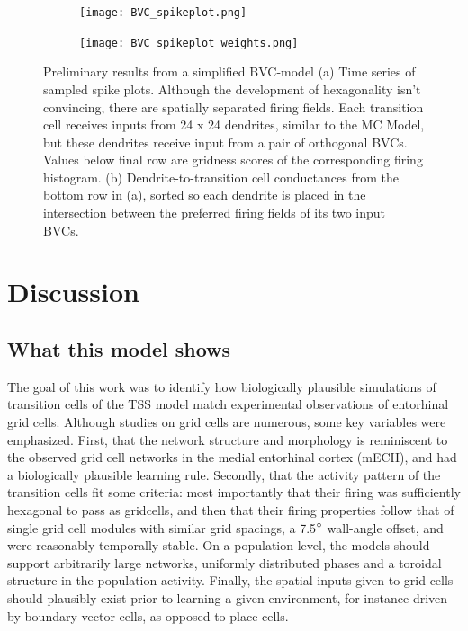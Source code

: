 \documentclass{article}
\begin{document}
    \begin{figure}[H]
        \begin{subfigure}{\textwidth}
            \subcaption{}
            \texttt{[image: BVC\_spikeplot.png]}
        \end{subfigure}
        \begin{subfigure}{\textwidth}
            \subcaption{}
            \hspace*{0.01\linewidth}
            \texttt{[image: BVC\_spikeplot\_weights.png]}
        \end{subfigure}

        \caption{Preliminary results from a simplified BVC-model (a) Time series of sampled spike plots. Although the development of hexagonality isn't convincing, there are spatially separated firing fields. Each transition cell receives inputs from 24 x 24 dendrites, similar to the MC Model, but these dendrites receive input from a pair of orthogonal BVCs. Values below final row are gridness scores of the corresponding firing histogram. (b) Dendrite-to-transition cell conductances from the bottom row in (a), sorted so each dendrite is placed in the intersection between the preferred firing fields of its two input BVCs.}
        \label{BVC_spikeplot}
    \end{figure}

    \newpage
    \section{Discussion} \label{Discussion}

    \subsection{What this model shows} \label{TheseResults}
    The goal of this work was to identify how biologically plausible simulations of transition cells of the TSS model match experimental observations of entorhinal grid cells. Although studies on grid cells are numerous, some key variables were emphasized. First, that the network structure and morphology is reminiscent to the observed grid cell networks in the medial entorhinal cortex (mECII), and had a biologically plausible learning rule. Secondly, that the activity pattern of the transition cells fit some criteria: most importantly that their firing was sufficiently hexagonal to pass as gridcells, and then that their firing properties follow that of single grid cell modules with similar grid spacings, a 7.5\(\degree\) wall-angle offset, and were reasonably temporally stable. On a population level, the models should support arbitrarily large networks, uniformly distributed phases and a toroidal structure in the population activity. Finally, the spatial inputs given to grid cells should plausibly exist prior to learning a given environment, for instance driven by boundary vector cells, as opposed to place cells.
\end{document}
